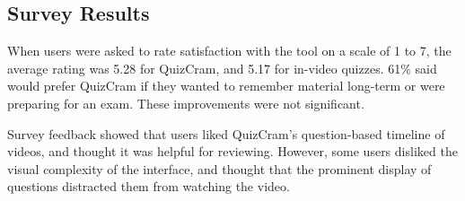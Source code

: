 \documentclass{sigchi}
\begin{document}



\subsection{Survey Results}

When users were asked to rate satisfaction with the tool on a scale of 1 to 7, the average rating was 5.28 for QuizCram, and 5.17 for in-video quizzes.  61\% said would prefer QuizCram if they wanted to remember material long-term or were preparing for an exam. These improvements were not significant.

Survey feedback showed that users liked QuizCram's question-based timeline of videos, and thought it was helpful for reviewing. However, some users disliked the visual complexity of the interface, and thought that the prominent display of questions distracted them from watching the video.
\end{document}
